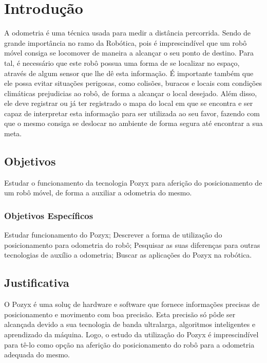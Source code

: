 \chapter{Introdução}
\label{chap:intro}

A odometria \'e uma t\'ecnica usada para medir a dist\^ancia percorrida. Sendo de grande import\^ancia no ramo da Rob\'otica, pois \'e imprescind\'ivel que um rob\^o m\'ovel consiga se locomover de maneira a alcan\c{c}ar o seu ponto de destino.
Para tal, \'e necess\'ario que este rob\^o possua uma forma de se localizar no espa\c{c}o, atrav\'es de algum sensor que lhe d\^e esta informa\c{c}\~ao.
\'E importante tamb\'em que ele possa evitar situa\c{c}\~oes perigosas, como colis\~oes, buracos e locais com condi\c{c}\~oes clim\'aticas prejudicias ao rob\^o, de forma a alcan\c{c}ar o local desejado.
Al\'em disso, ele deve registrar ou j\'a ter registrado o mapa do local em que se encontra e ser capaz de interpretar esta informa\c{c}\~ao para ser utilizada ao seu favor, fazendo com que o mesmo consiga se deslocar no ambiente de forma segura at\'e encontrar a sua meta.

\section{Objetivos}
\label{sec:obj}

Estudar o funcionamento da tecnologia Pozyx para aferi\c{c}\~ao do posicionamento de um rob\^o m\'ovel, de forma a auxiliar a odometria do mesmo.


\subsection{Objetivos Específicos}
\label{ssec:objesp}

Estudar funcionamento do Pozyx;
Descrever a forma de utiliza\c{c}\~ao do posicionamento para odometria do rob\^o;
Pesquisar as suas diferen\c{c}as para outras tecnologias de aux\'ilio a odometria;
Buscar as aplica\c{c}\~oes do Pozyx na rob\'otica.


\section{Justificativa}
\label{sec:justi}

O Pozyx \'e uma solu\c{c} de hardware e software que fornece informa\c{c}\~oes precisas de posicionamento e movimento com boa precis\~ao.
Esta precis\~ao s\'o p\^ode ser alcan\c{c}ada devido a sua tecnologia de banda ultralarga, algoritmos inteligentes e aprendizado da m\'aquina.
Logo, o estudo da utiliza\c{c}\~ao do Pozyx \'e imprescind\'ivel para t\^e-lo como op\c{c}\~ao na aferi\c{c}\~ao do posicionamento do rob\^o para a odometria adequada do mesmo. 

